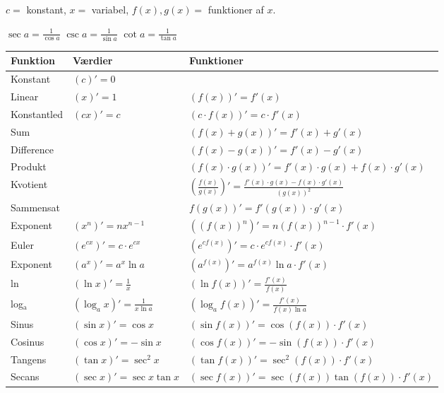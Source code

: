
$c =$ konstant, $x =$ variabel, $f(x), g(x) =$ funktioner af $x$.
\
\begin{center}
    \(\sec a = \frac{1}{\cos a}\)  \quad \(\csc a = \frac{1}{\sin a}\) \quad \(\cot a = \frac{1}{\tan a}\)
\end{center}

\begin{table}[H]
\centering
\begingroup
\small
\renewcommand{\arraystretch}{1.6}
\begin{tabular}{@{}>{\raggedright}p{2.65cm}ll@{}}
\toprule
\textbf{Funktion} & \textbf{Værdier} & \textbf{Funktioner} \\
\midrule
Konstant & $(c)' = 0$ &  \\
Linear & $(x)' = 1$ & $(f(x))' = f'(x)$ \\
Konstantled & $(cx)' = c$ & $(c \cdot f(x))' = c \cdot f'(x)$ \\
\midrule
Sum &  & $(f(x) + g(x))' = f'(x) + g'(x)$ \\
Difference &  & $(f(x) - g(x))' = f'(x) - g'(x)$ \\
Produkt &  & $(f(x) \cdot g(x))' = f'(x) \cdot g(x) + f(x) \cdot g'(x)$ \\
Kvotient &  & $\left(\frac{f(x)}{g(x)}\right)' = \frac{f'(x) \cdot g(x) - f(x) \cdot g'(x)}{(g(x))^2}$ \\
Sammensat &  & $f(g(x))' = f'(g(x)) \cdot g'(x)$ \\
\midrule
Exponent & $(x^n)' = n x^{n-1}$ & $((f(x))^n)' = n (f(x))^{n-1} \cdot f'(x)$ \\
Euler & $(e^{c x})' = c \cdot e^{c x}$ & $(e^{c f(x)})' = c \cdot e^{c f(x)} \cdot f'(x)$ \\
Exponent & $(a^x)' = a^x \ln a$ & $(a^{f(x)})' = a^{f(x)} \ln a \cdot f'(x)$ \\
ln & $(\ln x)' = \frac{1}{x}$ & $(\ln f(x))' = \frac{f'(x)}{f(x)}$ \\
log$_\text{a}$ & $(\log_a x)' = \frac{1}{x \ln a}$ & $(\log_a f(x))' = \frac{f'(x)}{f(x) \ln a}$ \\
\midrule
Sinus & $(\sin x)' = \cos x$ & $(\sin f(x))' = \cos(f(x)) \cdot f'(x)$ \\
Cosinus & $(\cos x)' = -\sin x$ & $(\cos f(x))' = -\sin(f(x)) \cdot f'(x)$ \\
Tangens & $(\tan x)' = \sec^2 x$ & $(\tan f(x))' = \sec^2(f(x)) \cdot f'(x)$ \\
Secans & $(\sec x)' = \sec x \tan x$ & $(\sec f(x))' = \sec(f(x)) \tan(f(x)) \cdot f'(x)$ \\

\end{tabular}
\end{table}

